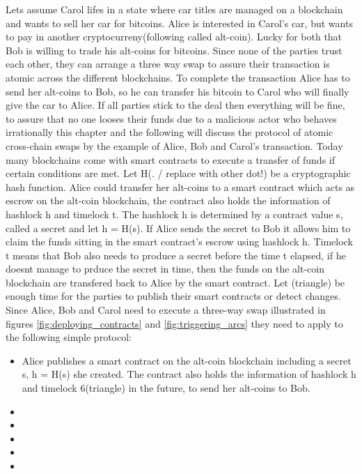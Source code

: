 Lets assume Carol lifes in a state where car titles are managed on a blockchain and wants to sell her car for bitcoins. Alice is interested in Carol's car, but wants to pay in another cryptocurreny(following called alt-coin). Lucky for both that Bob is willing to trade his alt-coins for bitcoins. Since none of the parties trust each other, they can arrange a three way swap to assure their transaction is atomic across the different blockchains. To complete the transaction Alice has to send her alt-coins to Bob, so he can transfer his bitcoin to Carol who will finally give the car to Alice. If all parties stick to the deal then everything will be fine, to assure that no one looses their funds due to a malicious actor who behaves irrationally this chapter and the following will discuss the protocol of atomic cross-chain swaps by the example of Alice, Bob and Carol's transaction. Today many blockchains come with smart contracts to execute a transfer of funds if certain conditions are met.
Let H(. / replace with other dot!) be a cryptographic hash function. Alice could transfer her alt-coins to a smart contract which acts as escrow on the alt-coin blockchain, the contract also holds the information of hashlock h and timelock t. The hashlock h is determined by a contract value s, called a secret and let h = H(s). If Alice sends the secret to Bob it allows him to claim the funds sitting in the smart contract's escrow using hashlock h. Timelock t means that Bob also needs to produce a secret before the time t elapsed, if he doesnt manage to prduce the secret in time, then the funds on the alt-coin blockchain are transfered back to Alice by the smart contract. Let (triangle) be enough time for the parties to publish their smart contracts or detect changes. Since Alice, Bob and Carol need to execute a three-way swap illustrated in figures \ref{fig:deploying_contracts} and \ref{fig:triggering_arcs} they need to apply to the following simple protocol: \newline
\begin{itemize}
	\item Alice publishes a smart contract on the alt-coin blockchain including a secret s, h = H(s) she created. The contract also holds the information of hashlock h and timelock 6(triangle) in the future, to send her alt-coins to Bob.
	\item 
	\item 
	\item 
	\item 
	\item 
\end{itemize}


